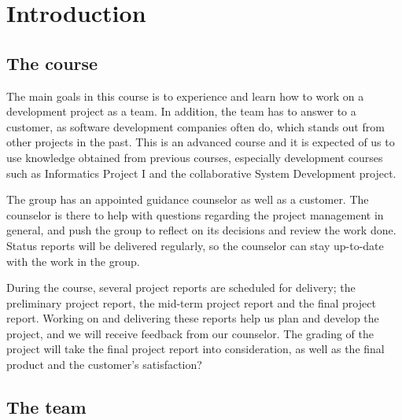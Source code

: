 \section{Introduction}

\subsection{The course}

The main goals in this course is to experience and learn how to work on a development project as a team. In addition, the team has to answer to a customer, as software development companies often do, which stands out from other projects in the past. This is an advanced course and it is expected of us to use knowledge obtained from previous courses, especially development courses such as Informatics Project I and the collaborative System Development project. 

The group has an appointed guidance counselor as well as a customer. The counselor is there to help with questions regarding the project management in general, and push the group to reflect on its decisions and review the work done. Status reports will be delivered regularly, so the counselor can stay up-to-date with the work in the group. 

During the course, several project reports are scheduled for delivery; the preliminary project report, the mid-term project report and the final project report. Working on and delivering these reports help us plan and develop the project, and we will receive feedback from our counselor. The grading of the project will take the final project report into consideration, as well as the final product and the customer’s satisfaction?

\subsection{The team}

